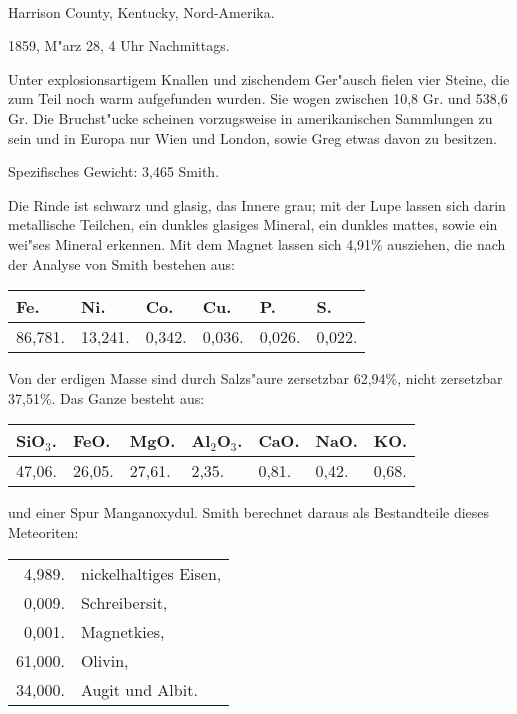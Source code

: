 \documentclass[a4paper, 11pt, oneside]{article}
\begin{document}
\paragraph{}
Harrison County, Kentucky, Nord-Amerika.

1859, M"arz 28, 4 Uhr Nachmittags.

Unter explosionsartigem Knallen und zischendem Ger"ausch fielen vier Steine, die zum Teil noch warm aufgefunden wurden. Sie wogen zwischen 10,8 Gr. und 538,6 Gr. Die Bruchst"ucke scheinen vorzugsweise in amerikanischen Sammlungen zu sein und in Europa nur Wien und London, sowie Greg etwas davon zu besitzen.

Spezifisches Gewicht: 3,465 Smith.

Die Rinde ist schwarz und glasig, das Innere grau; mit der Lupe lassen sich darin metallische Teilchen, ein dunkles glasiges Mineral, ein dunkles mattes, sowie ein wei"ses Mineral erkennen. Mit dem Magnet lassen sich 4,91\% ausziehen, die nach der Analyse von Smith bestehen aus:
\begin{table}[H]
    \centering
    \begin{tabular}{l l l l l l}
        Fe. & Ni. & Co. & Cu. & P. & S. \\ \hline
        86,781. & 13,241. & 0,342. & 0,036. & 0,026. & 0,022. \\
    \end{tabular}
\end{table}

Von der erdigen Masse sind durch Salzs"aure zersetzbar 62,94\%, nicht zersetzbar 37,51\%. Das Ganze besteht aus:
\begin{table}[H]
    \centering
    \begin{tabular}{l l l l l l l}
        SiO$_{3}$. & FeO. & MgO. & Al$_{2}$O$_{3}$. & CaO. & NaO. & KO. \\ \hline
        47,06. & 26,05. & 27,61. & 2,35. & 0,81. & 0,42. & 0,68. \\
    \end{tabular}
\end{table}

und einer Spur Manganoxydul. Smith berechnet daraus als Bestandteile dieses Meteoriten:
\begin{table}[H]
    \centering
    \begin{tabular}{r l}
        4,989. & nickelhaltiges Eisen, \\
        0,009. & Schreibersit, \\
        0,001. & Magnetkies, \\
        61,000. & Olivin, \\
        34,000. & Augit und Albit. \\
    \end{tabular}
\end{table}
\end{document}
